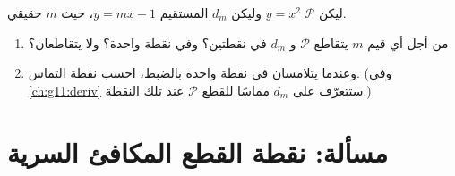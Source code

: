 \begin{exercise}[$\star\star\star$]\label{exo:g11:quad:11}
ليكن $\mathcal P$  $y = x^2$ وليكن $d_m$ المستقيم
$y = mx - 1$، حيث $m$  حقيقي.
\begin{enumerate}
  \item من أجل أي قيم $m$ يتقاطع $\mathcal P$ و $d_m$ في نقطتين؟
        وفي نقطة واحدة؟ ولا يتقاطعان؟
  \item وعندما يتلامسان في نقطة واحدة بالضبط، احسب نقطة التماس.
        (وفي \cref{ch:g11:deriv} ستتعرّف على $d_m$ مماسًا للقطع
        $\mathcal P$ عند تلك النقطة.)
\end{enumerate}
\end{exercise}

\section{مسألة: نقطة القطع المكافئ السرية}


